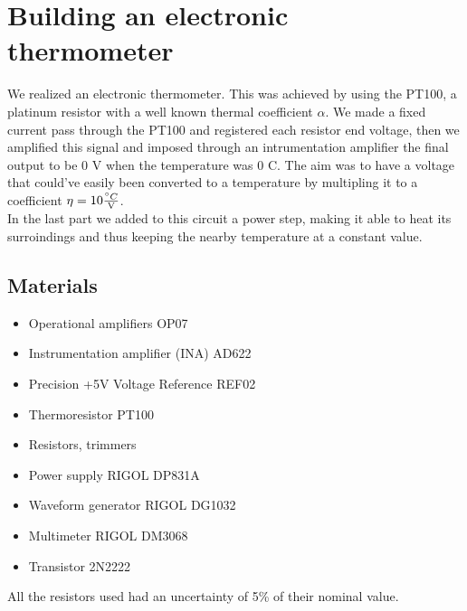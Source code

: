 \chapter{Building an electronic thermometer}
We realized an electronic thermometer. This was achieved by using the PT100, a platinum resistor with a well known thermal coefficient $\alpha$. We made a fixed current pass through the PT100 and registered each resistor end voltage, then we amplified this signal and imposed through an intrumentation amplifier the final output to be 0 V when the temperature was 0 \degree C. The aim was to have a voltage that could've easily been  converted to a temperature by multipling it to a coefficient $\eta = 10 \frac{\degree C}{\text{V}}$.\\
In the last part we added to this circuit a power step, making it able to heat its surroindings and thus keeping the nearby temperature at a constant value.

\section{Materials}
\begin{itemize}
\item Operational amplifiers OP07
\item Instrumentation amplifier (INA) AD622
\item Precision +5V Voltage Reference REF02
\item Thermoresistor PT100
\item Resistors, trimmers
\item Power supply RIGOL DP831A
\item Waveform generator RIGOL DG1032
\item Multimeter RIGOL DM3068
\item Transistor 2N2222
\end{itemize}
All the resistors used had an uncertainty of 5\% of their nominal value.

